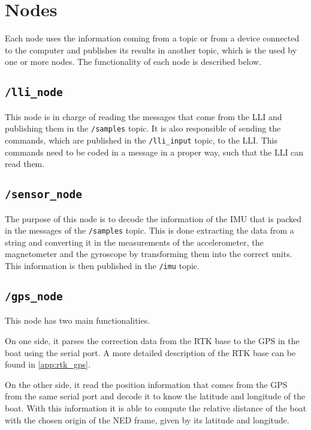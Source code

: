 \section{Nodes}
Each node uses the information coming from a topic or from a device connected to the computer and publishes its results in another topic, which is the used by one or more nodes. The functionality of each node is described below.

\subsection*{\lstinline[style=cinline]{/lli_node}}
This node is in charge of reading the messages that come from the LLI and publishing them in the \lstinline[style=cinline]{/samples} topic. It is also responsible of sending the commands, which are published in the \lstinline[style=cinline]{/lli_input} topic, to the LLI. This commands need to be coded in a message in a proper way, such that the LLI can read them.

\subsection*{\lstinline[style=cinline]{/sensor_node}}
The purpose of this node is to decode the information of the IMU that is packed in the messages of the \lstinline[style=cinline]{/samples} topic. This is done extracting the data from a string and converting it in the measurements of the accelerometer, the magnetometer and the gyroscope by transforming them into the correct units. This information is then published in the \lstinline[style=cinline]{/imu} topic.

\subsection*{\lstinline[style=cinline]{/gps_node}}
This node has two main functionalities. 

On one side, it parses the correction data from the RTK base to the GPS in the boat using the serial port. A more detailed description of the RTK base can be found in \autoref{app:rtk_gps}. 

On the other side, it read the position information that comes from the GPS from the same serial port and decode it to know the latitude and longitude of the boat. With this information it is able to compute the relative distance of the boat with the chosen origin of the NED frame, given by its latitude and longitude.

